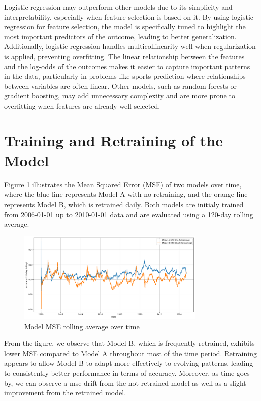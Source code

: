 Logistic regression may outperform other models due to its simplicity and interpretability, especially when feature selection is based on it. By using logistic regression for feature selection, the model is specifically tuned to highlight the most important predictors of the outcome, leading to better generalization. Additionally, logistic regression handles multicollinearity well when regularization is applied, preventing overfitting. The linear relationship between the features and the log-odds of the outcomes makes it easier to capture important patterns in the data, particularly in problems like sports prediction where relationships between variables are often linear. Other models, such as random forests or gradient boosting, may add unnecessary complexity and are more prone to overfitting when features are already well-selected.


\section{Training and Retraining of the Model}
\label{sec:training_retraining}

Figure \ref{fig:mse_retraining} illustrates the Mean Squared Error (MSE) of two models over time, where the blue line represents Model A with no retraining, and the orange line represents Model B, which is retrained daily. Both models are initialy trained from 2006-01-01 up to 2010-01-01 data and are evaluated using a 120-day rolling average.

\begin{figure}[H]
    \centering
    \includegraphics[width=0.8\textwidth, keepaspectratio]{images/model_ratrining_mse_120rd.png}
    \caption{Model MSE rolling average over time}
    \label{fig:mse_retraining}
\end{figure}


From the figure, we observe that Model B, which is frequently retrained, exhibits lower MSE compared to Model A throughout most of the time period. Retraining appears to allow Model B to adapt more effectively to evolving patterns, leading to consistently better performance in terms of accuracy. Moreover, as time goes by, we can observe a mse drift from the not retrained model as well as a slight improvement from the retrained model. \\

